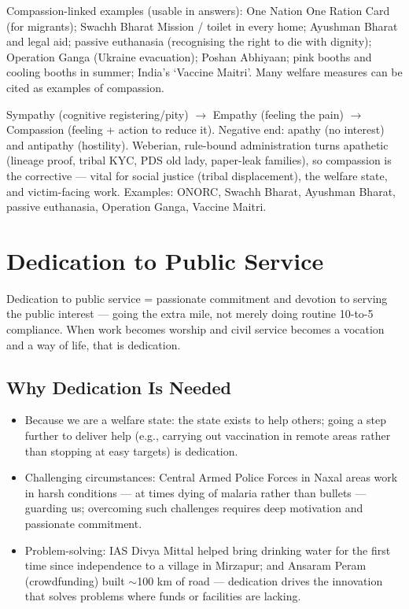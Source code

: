 \begin{GovtPolicy}
Compassion-linked examples (usable in answers): One Nation One Ration Card (for migrants); Swachh Bharat Mission / toilet in every home; Ayushman Bharat and legal aid; passive euthanasia (recognising the right to die with dignity); Operation Ganga (Ukraine evacuation); Poshan Abhiyaan; pink booths and cooling booths in summer; India's `Vaccine Maitri'. Many welfare measures can be cited as examples of compassion.
\end{GovtPolicy}

\begin{QuickRevision}
Sympathy (cognitive registering/pity) $\rightarrow$ Empathy (feeling the pain) $\rightarrow$ Compassion (feeling + action to reduce it). Negative end: apathy (no interest) and antipathy (hostility). Weberian, rule-bound administration turns apathetic (lineage proof, tribal KYC, PDS old lady, paper-leak families), so compassion is the corrective --- vital for social justice (tribal displacement), the welfare state, and victim-facing work. Examples: ONORC, Swachh Bharat, Ayushman Bharat, passive euthanasia, Operation Ganga, Vaccine Maitri.
\end{QuickRevision}

\section{Dedication to Public Service}

\begin{KeyConcept}
Dedication to public service = passionate commitment and devotion to serving the public interest --- going the extra mile, not merely doing routine 10-to-5 compliance. When work becomes worship and civil service becomes a vocation and a way of life, that is dedication.
\end{KeyConcept}

\subsection{Why Dedication Is Needed}

\begin{itemize}
\item Because we are a welfare state: the state exists to help others; going a step further to deliver help (e.g., carrying out vaccination in remote areas rather than stopping at easy targets) is dedication.
\item Challenging circumstances: Central Armed Police Forces in Naxal areas work in harsh conditions --- at times dying of malaria rather than bullets --- guarding us; overcoming such challenges requires deep motivation and passionate commitment.
\item Problem-solving: IAS Divya Mittal helped bring drinking water for the first time since independence to a village in Mirzapur; and Ansaram Peram (crowdfunding) built $\sim$100 km of road --- dedication drives the innovation that solves problems where funds or facilities are lacking.
\end{itemize}

